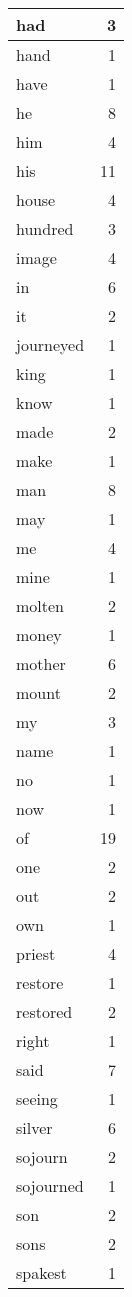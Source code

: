 \begin{center}
\begin{longtable}{l|r}
had & 3\\ \hline 
hand & 1\\ \hline 
have & 1\\ \hline 
he & 8\\ \hline 
him & 4\\ \hline 
his & 11\\ \hline 
house & 4\\ \hline 
hundred & 3\\ \hline 
image & 4\\ \hline 
in & 6\\ \hline 
it & 2\\ \hline 
journeyed & 1\\ \hline 
king & 1\\ \hline 
know & 1\\ \hline 
made & 2\\ \hline 
make & 1\\ \hline 
man & 8\\ \hline 
may & 1\\ \hline 
me & 4\\ \hline 
mine & 1\\ \hline 
molten & 2\\ \hline 
money & 1\\ \hline 
mother & 6\\ \hline 
mount & 2\\ \hline 
my & 3\\ \hline 
name & 1\\ \hline 
no & 1\\ \hline 
now & 1\\ \hline 
of & 19\\ \hline 
one & 2\\ \hline 
out & 2\\ \hline 
own & 1\\ \hline 
priest & 4\\ \hline 
restore & 1\\ \hline 
restored & 2\\ \hline 
right & 1\\ \hline 
said & 7\\ \hline 
seeing & 1\\ \hline 
silver & 6\\ \hline 
sojourn & 2\\ \hline 
sojourned & 1\\ \hline 
son & 2\\ \hline 
sons & 2\\ \hline 
spakest & 1\\ \hline 

\end{longtable}
\end{center}
